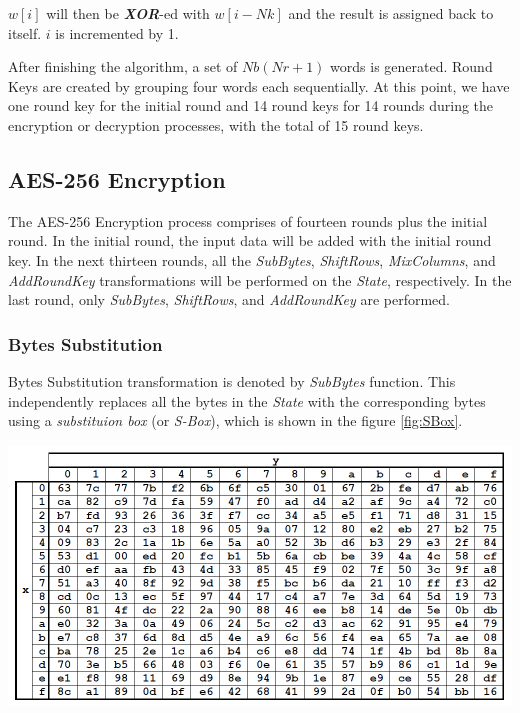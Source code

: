 \documentclass[a4paper, 10pt]{article}
\newenvironment{Figure}
    {\par\medskip\noindent\minipage{\linewidth}}
    {\endminipage\par\medskip}
\begin{document}
\begin{multicols}{2}
                $w[i]$ will then be \textbf{\textit{XOR}}-ed with $w[i-Nk]$ and the result is assigned back to itself. $i$ is incremented by 1.

                After finishing the algorithm, a set of $Nb(Nr+1)$ words is generated. Round Keys are created by grouping four words each sequentially. At this point, we have one round key for the initial round and 14 round keys for 14 rounds during the encryption or decryption processes, with the total of 15 round keys.

            \subsection{AES-256 Encryption}

	The AES-256 Encryption process comprises of fourteen rounds plus the initial round. In the initial round, the input data will be added with the initial round key. In the next thirteen rounds, all the  \textit{SubBytes}, \textit{ShiftRows}, \textit{MixColumns}, and \textit{AddRoundKey} transformations will be performed on the \textit{State}, respectively. In the last round, only \textit{SubBytes}, \textit{ShiftRows}, and \textit{AddRoundKey} are performed.

            \subsubsection{Bytes Substitution}

            Bytes Substitution transformation is denoted by \textit{SubBytes} function. This independently replaces all the bytes in the \textit{State} with the corresponding bytes using a \textit{substituion box} (or \textit{S-Box}), which is shown in the figure \ref{fig:SBox}.

            \noindent
            \begin{Figure}
                \centering
                \includegraphics[width=\linewidth]{S-Box.png}
                \label{fig:SBox}
            \end{Figure}


\end{multicols}
\end{document}
